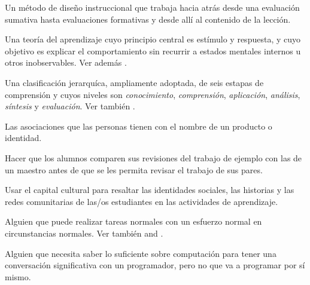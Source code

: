 \begin{description}
 Un método de diseño instruccional que
trabaja hacia atrás desde una evaluación sumativa hasta evaluaciones formativas y desde allí al contenido de la lección.

 Una teoría del aprendizaje cuyo principio central
es estímulo y respuesta, y cuyo objetivo es explicar el comportamiento sin recurrir
a estados mentales internos u otros inobservables. Ver
además .

 Una clasificación jerarquíca, ampliamente adoptada, 
de seis estapas de comprensión y cuyos niveles son \emph{conocimiento},
\emph{comprensión}, \emph{aplicación}, \emph{análisis}, \emph{síntesis} y
\emph{evaluación}. 
Ver también .

 Las asociaciones que las personas tienen con el nombre de un producto o
identidad.

 Hacer que los alumnos comparen sus 
revisiones del trabajo de ejemplo con las de un maestro antes de que 
se les permita revisar el trabajo de sus pares.




 Usar el capital cultural 
para resaltar las identidades sociales, las historias y las redes comunitarias de 
las/os estudiantes en las actividades de aprendizaje.




 Alguien que puede 
realizar tareas normales con un esfuerzo normal en circunstancias normales. Ver también
 and .








 Alguien que necesita saber
lo suficiente sobre computación para tener una conversación significativa con un programador, 
pero no que va a programar por sí mismo.

















\end{description}
